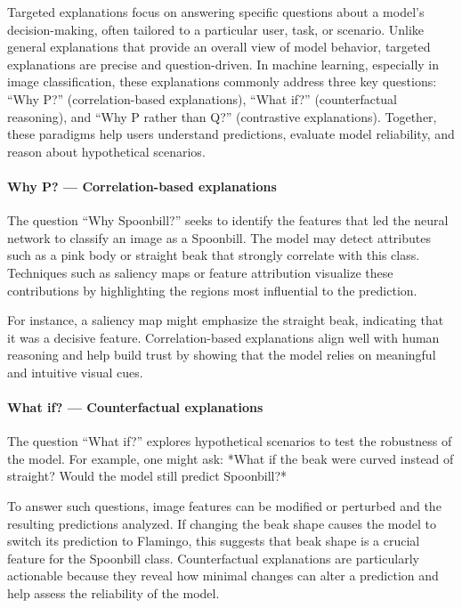 \documentclass{article}
\begin{document}
Targeted explanations focus on answering specific questions about a model’s decision-making, often tailored to a particular user, task, or scenario. Unlike general explanations that provide an overall view of model behavior, targeted explanations are precise and question-driven. In machine learning, especially in image classification, these explanations commonly address three key questions: 
``Why P?'' (correlation-based explanations), 
``What if?'' (counterfactual reasoning), and 
``Why P rather than Q?'' (contrastive explanations).  
Together, these paradigms help users understand predictions, evaluate model reliability, and reason about hypothetical scenarios.

\paragraph{Why P? — Correlation-based explanations}
The question ``Why Spoonbill?'' seeks to identify the features that led the neural network to classify an image as a Spoonbill. The model may detect attributes such as a pink body or straight beak that strongly correlate with this class. Techniques such as saliency maps or feature attribution visualize these contributions by highlighting the regions most influential to the prediction. 

For instance, a saliency map might emphasize the straight beak, indicating that it was a decisive feature. Correlation-based explanations align well with human reasoning and help build trust by showing that the model relies on meaningful and intuitive visual cues.

\paragraph{What if? — Counterfactual explanations}
The question ``What if?'' explores hypothetical scenarios to test the robustness of the model. For example, one might ask: *What if the beak were curved instead of straight? Would the model still predict Spoonbill?*  

To answer such questions, image features can be modified or perturbed and the resulting predictions analyzed. If changing the beak shape causes the model to switch its prediction to Flamingo, this suggests that beak shape is a crucial feature for the Spoonbill class. Counterfactual explanations are particularly actionable because they reveal how minimal changes can alter a prediction and help assess the reliability of the model.
\end{document}
